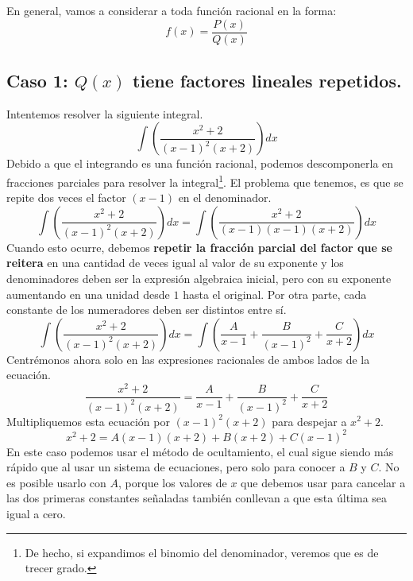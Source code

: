 \documentclass[12pt]{article}
\begin{document}
En general, vamos a considerar a toda función racional en la forma:
\[
  f(x) = \frac{P(x)}{Q(x)}
\]

\subsection{Caso 1: \texorpdfstring{$Q(x)$}{Denominador} tiene factores lineales repetidos.}

Intentemos resolver la siguiente integral.
\[
  \int \left(\frac{x^{2} + 2}{(x - 1)^{2}(x + 2)}\right) dx
\]
Debido a que el integrando es una función racional, podemos descomponerla en fracciones parciales para resolver la integral\footnote{De hecho, si expandimos el binomio del denominador, veremos que es de trecer grado.}. El problema que tenemos, es que se repite dos veces el factor $(x - 1)$ en el denominador.
\[
  \int \left(\frac{x^{2} + 2}{(x - 1)^{2}(x + 2)}\right) dx = \int \left(\frac{x^{2} + 2}{(x - 1)(x - 1)(x + 2)}\right) dx
\]
Cuando esto ocurre, debemos \textbf{repetir la fracción parcial del factor que se reitera} en una cantidad de veces igual al valor de su exponente y los denominadores deben ser la expresión algebraica inicial, pero con su exponente aumentando en una unidad desde $1$ hasta el original. Por otra parte, cada constante de los numeradores deben ser distintos entre sí.
\[
  \int \left(\frac{x^{2} + 2}{(x - 1)^{2}(x + 2)}\right) dx = \int \left(\frac{A}{x - 1} + \frac{B}{(x - 1)^{2}} + \frac{C}{x + 2}\right) dx
\]
Centrémonos ahora solo en las expresiones racionales de ambos lados de la ecuación.
\[
  \frac{x^{2} + 2}{(x - 1)^{2}(x + 2)} = \frac{A}{x - 1} + \frac{B}{(x - 1)^{2}} + \frac{C}{x + 2}
\]
Multipliquemos esta ecuación por $(x - 1)^{2} (x + 2)$ para despejar a $x^{2} + 2$.
\[
  x^{2} + 2 = A(x - 1)(x + 2) + B(x + 2) + C(x - 1)^{2}
\]
En este caso podemos usar el método de ocultamiento, el cual sigue siendo más rápido que al usar un sistema de ecuaciones, pero solo para conocer a $B$ y $C$. No es posible usarlo con $A$, porque los valores de $x$ que debemos usar para cancelar a las dos primeras constantes señaladas también conllevan a que esta última sea igual a cero.
\end{document}
